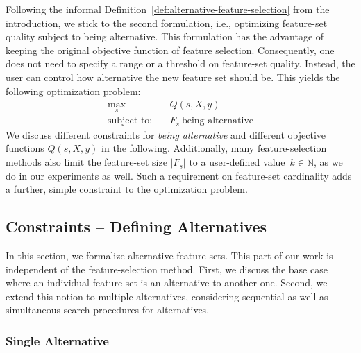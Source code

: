 \documentclass{article}
\theoremstyle{definition}
\begin{document}
Following the informal Definition~\ref{def:alternative-feature-selection} from the introduction, we stick to the second formulation, i.e., optimizing feature-set quality subject to being alternative.
This formulation has the advantage of keeping the original objective function of feature selection.
Consequently, one does not need to specify a range or a threshold on feature-set quality.
Instead, the user can control how alternative the new feature set should be.
This yields the following optimization problem:
%
\begin{equation}
	\begin{aligned}
		\max_s &\quad Q(s,X,y) \\
		\text{subject to:} &\quad F_s~\text{being alternative}
	\end{aligned}
	\label{eq:afs-general}
\end{equation}
%
We discuss different constraints for \emph{being alternative} and different objective functions $Q(s,X,y)$ in the following.
Additionally, many feature-selection methods also limit the feature-set size $|F_s|$ to a user-defined value~$k \in \mathbb{N}$, as we do in our experiments as well.
Such a requirement on feature-set cardinality adds a further, simple constraint to the optimization problem.

\subsection{Constraints -- Defining Alternatives}
\label{sec:approach:constraints}

In this section, we formalize alternative feature sets.
This part of our work is independent of the feature-selection method.
First, we discuss the base case where an individual feature set is an alternative to another one.
Second, we extend this notion to multiple alternatives, considering sequential as well as simultaneous search procedures for alternatives.

\subsubsection{Single Alternative}
\label{sec:approach:constraints:single}
\end{document}
